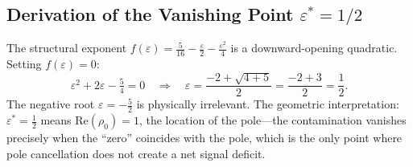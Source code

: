\documentclass[12pt]{article}
\theoremstyle{remark}
\begin{document}
\subsection{Derivation of the Vanishing Point $\varepsilon^* = 1/2$}

The structural exponent $f(\varepsilon) = \tfrac{5}{16} -
\tfrac{\varepsilon}{2} - \tfrac{\varepsilon^2}{4}$ is a downward-opening
quadratic. Setting $f(\varepsilon) = 0$:
\[
\varepsilon^2 + 2\varepsilon - \tfrac{5}{4} = 0
\quad\Longrightarrow\quad
\varepsilon = \frac{-2 + \sqrt{4 + 5}}{2} = \frac{-2+3}{2} = \frac{1}{2}.
\]
The negative root $\varepsilon = -\tfrac{5}{2}$ is physically irrelevant.
The geometric interpretation: $\varepsilon^* = \tfrac{1}{2}$ means
$\mathrm{Re}(\rho_0) = 1$, the location of the pole---the contamination
vanishes precisely when the ``zero'' coincides with the pole, which is
the only point where pole cancellation does not create a net signal deficit.
\end{document}
